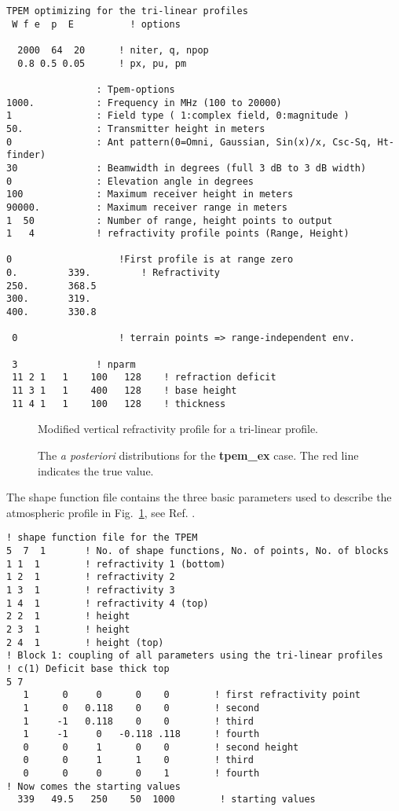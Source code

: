 \documentclass{saclantc}
\begin{document}
\small
\begin{verbatim}
TPEM optimizing for the tri-linear profiles 
 W f e  p  E          ! options 

  2000  64  20		! niter, q, npop
  0.8 0.5 0.05		! px, pu, pm
                 
                : Tpem-options
1000.           : Frequency in MHz (100 to 20000)
1               : Field type ( 1:complex field, 0:magnitude )
50.           	: Transmitter height in meters
0             	: Ant pattern(0=Omni, Gaussian, Sin(x)/x, Csc-Sq, Ht-finder)
30            	: Beamwidth in degrees (full 3 dB to 3 dB width)
0             	: Elevation angle in degrees
100          	: Maximum receiver height in meters
90000.          : Maximum receiver range in meters
1  50         	: Number of range, height points to output
1   4           ! refractivity profile points (Range, Height)

0                	!First profile is at range zero
0.         339.         ! Refractivity
250.       368.5
300.       319.
400.       330.8

 0              	! terrain points => range-independent env.

 3 				! nparm                 
 11 2 1   1    100   128	! refraction deficit
 11 3 1   1    400   128	! base height
 11 4 1   1    100   128	! thickness
\end{verbatim}
\normalsize
\begin{figure}
\epsfxsize=10cm
\centerline{}
\caption{Modified vertical refractivity profile for a tri-linear profile.}
\label{fig:em_env}
\end{figure}
\begin{figure}
\epsfxsize=12cm
\centerline{}
\caption{The {\it a posteriori} distributions for the {\bf tpem{\_}ex}
case. The red line indicates the true value.}
\label{fig:tpem_ppd}
\end{figure}
The shape function file contains the three basic parameters  used
to describe the atmospheric profile in Fig.\ \ref{fig:em_env}, see Ref. 
\cite{gingras:ieee97}.

\small
\begin{verbatim}
! shape function file for the TPEM 
5  7  1       ! No. of shape functions, No. of points, No. of blocks
1 1  1        ! refractivity 1 (bottom)
1 2  1        ! refractivity 2
1 3  1        ! refractivity 3
1 4  1        ! refractivity 4 (top)
2 2  1        ! height
2 3  1        ! height
2 4  1        ! height (top)
! Block 1: coupling of all parameters using the tri-linear profiles
! c(1) Deficit base thick top
5 7
   1      0     0      0    0        ! first refractivity point
   1      0   0.118    0    0        ! second
   1     -1   0.118    0    0        ! third
   1     -1     0   -0.118 .118      ! fourth
   0      0     1      0    0        ! second height
   0      0     1      1    0        ! third 
   0      0     0      0    1        ! fourth
! Now comes the starting values
  339   49.5   250    50  1000        ! starting values
\end{verbatim}
\normalsize
\end{document}
